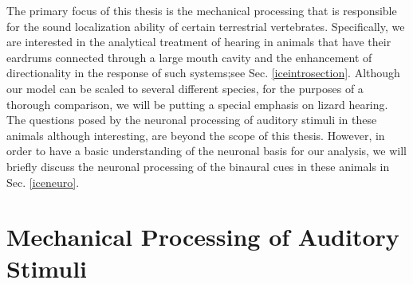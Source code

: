 \documentclass[12pt]{book}
\begin{document}
The primary focus of this thesis is the mechanical processing that is responsible for the
sound localization ability of certain terrestrial vertebrates. Specifically, we are interested
in the analytical treatment of hearing in animals that have their eardrums connected through a large mouth cavity and the
 enhancement of directionality in the response of such systems;see Sec. \ref{iceintrosection}. Although our model can be scaled to several different species,
 for the purposes of a thorough comparison, we will be putting a special emphasis on lizard hearing. The questions posed by the neuronal processing of auditory stimuli in these
animals although interesting, are beyond the scope of this thesis. However, in order to have a basic understanding of the neuronal basis for our analysis, we will briefly discuss the neuronal processing of the binaural cues
in these animals in Sec. \ref{iceneuro}.

\section{Mechanical Processing of Auditory Stimuli}\label{mechanicalprocessing}
\end{document}
